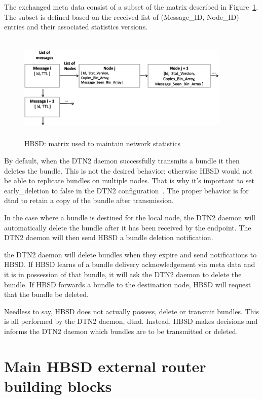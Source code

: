 The exchanged meta data consist of a subset of the matrix described in Figure~\ref{Stat-Mat}. The subset is defined based on the received list of (Message\_ID, Node\_ID) entries and their associated statistics versions.


\begin{figure}[!h]
\centering
\includegraphics[width=4in,height=2in]{Chapitre4/Stat_Matrix.eps}
\caption{HBSD: matrix used to maintain network statistics}
\label{Stat-Mat}
\end{figure}

By default, when the DTN2 daemon successfully transmits a bundle it then deletes the bundle. This is
not the desired behavior; otherwise HBSD would not be able to replicate bundles on
multiple nodes. That is why it's important to set early\_deletion to false in the DTN2
configuration~\cite{HBSDDTN2}. The proper behavior is for dtnd to retain a copy of the bundle after
transmission.

In the case where a bundle is destined for the local node, the DTN2 daemon will automatically delete
the bundle after it has been received by the endpoint. The DTN2 daemon will then send HBSD a
bundle deletion notification.

the DTN2 daemon will delete bundles when they expire and send notifications to HBSD.
If HBSD learns of a bundle delivery acknowledgement via meta data and it is in
possession of that bundle, it will ask the DTN2 daemon to delete the bundle.
If HBSD forwards a bundle to the destination node, HBSD will request that the bundle
be deleted.

Needless to say, HBSD does not actually possess, delete or transmit bundles. This is all
performed by the DTN2 daemon, dtnd. Instead, HBSD makes decisions and informs the DTN2 daemon which
bundles are to be transmitted or deleted.


\section{Main HBSD external router building blocks}

